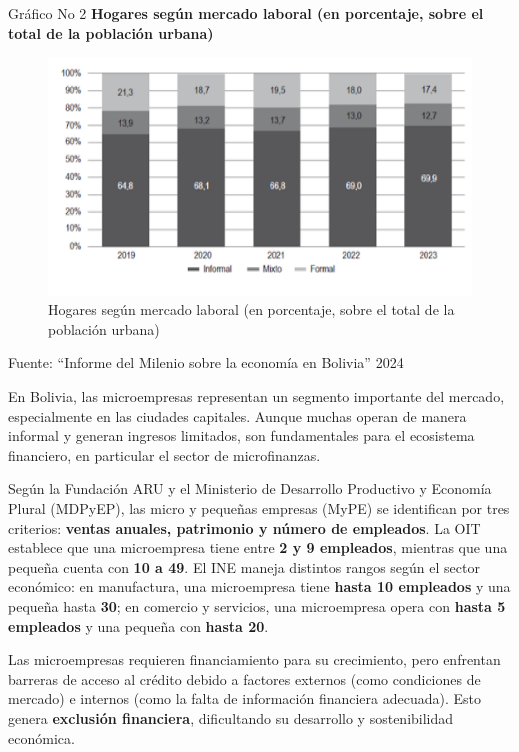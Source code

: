 \documentclass[Royal,times,sageh]{sagej}
\begin{document}
Gráfico No 2 \textbf{Hogares según mercado laboral (en porcentaje, sobre
el total de la población urbana)}

\begin{figure}

{\centering \includegraphics[width=0.8\linewidth]{Imagen 2} 

}

\caption{Hogares según mercado laboral (en porcentaje, sobre el total de la población urbana)}\label{fig:i2}
\end{figure}

Fuente: ``Informe del Milenio sobre la economía en Bolivia'' 2024

En Bolivia, las microempresas representan un segmento importante del
mercado, especialmente en las ciudades capitales. Aunque muchas operan
de manera informal y generan ingresos limitados, son fundamentales para
el ecosistema financiero, en particular el sector de microfinanzas.

Según la Fundación ARU y el Ministerio de Desarrollo Productivo y
Economía Plural (MDPyEP), las micro y pequeñas empresas (MyPE) se
identifican por tres criterios: \textbf{ventas anuales, patrimonio y
número de empleados}. La OIT establece que una microempresa tiene entre
\textbf{2 y 9 empleados}, mientras que una pequeña cuenta con \textbf{10
a 49}. El INE maneja distintos rangos según el sector económico: en
manufactura, una microempresa tiene \textbf{hasta 10 empleados} y una
pequeña hasta \textbf{30}; en comercio y servicios, una microempresa
opera con \textbf{hasta 5 empleados} y una pequeña con \textbf{hasta
20}.

Las microempresas requieren financiamiento para su crecimiento, pero
enfrentan barreras de acceso al crédito debido a factores externos (como
condiciones de mercado) e internos (como la falta de información
financiera adecuada). Esto genera \textbf{exclusión financiera},
dificultando su desarrollo y sostenibilidad económica.
\end{document}
